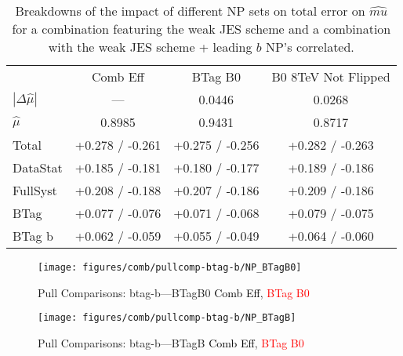 \begin{table}[!htbp]\captionsetup{justification=centering}
\begin{center}\begin{tabular}{lccc}
\hline\hline
 &Comb Eff &BTag B0 &B0 8TeV Not Flipped\\
$\left|\Delta\hat{\mu}\right|$ & --- & 0.0446 & 0.0268\\
$\hat{\mu}$ & 0.8985 & 0.9431 & 0.8717\\
\hline
Total &  +0.278 / -0.261  &  +0.275 / -0.256  &  +0.282 / -0.263 \\
DataStat &  +0.185 / -0.181  &  +0.180 / -0.177  &  +0.189 / -0.186 \\
FullSyst &  +0.208 / -0.188  &  +0.207 / -0.186  &  +0.209 / -0.186 \\
\hline
BTag &  +0.077 / -0.076  &  +0.071 / -0.068  &  +0.079 / -0.075 \\
BTag b &  +0.062 / -0.059  &  +0.055 / -0.049  &  +0.064 / -0.060 \\
\hline
\hline
\end{tabular}
\caption{Breakdowns of the impact of different NP sets on total error on $\hat{mu}$ for a combination featuring the weak JES scheme and a combination with the weak JES scheme + leading $b$ NP's correlated.}
\label{tab:Breakdowns:btag-b}
\end{center}\end{table}


\begin{figure}[!htbp]\captionsetup{justification=centering}
\centering\texttt{[image: figures/comb/pullcomp-btag-b/NP\_BTagB0]}
  \caption{Pull Comparisons: btag-b---BTagB0  \textcolor{black}{Comb Eff}, \textcolor{red}{BTag B0}}
  \label{fig:PullComparisons:btag-b---BTagB0}
\end{figure}

\begin{figure}[!htbp]\captionsetup{justification=centering}
\centering\texttt{[image: figures/comb/pullcomp-btag-b/NP\_BTagB]}
  \caption{Pull Comparisons: btag-b---BTagB  \textcolor{black}{Comb Eff}, \textcolor{red}{BTag B0}}
  \label{fig:PullComparisons:btag-b---BTagB}
\end{figure}

